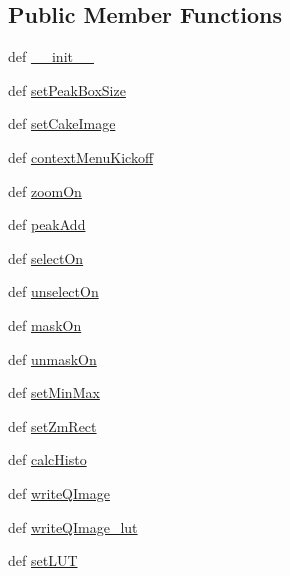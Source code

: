 \subsection*{Public Member Functions}
\begin{DoxyCompactItemize}
\item 
def \hyperlink{classmy_im_display_1_1my_im_display_ac84ff467e290df4e4ab1d4c65d4267f5}{\-\_\-\-\_\-init\-\_\-\-\_\-}
\item 
def \hyperlink{classmy_im_display_1_1my_im_display_ab744180f478698e143f8470430f1d192}{set\-Peak\-Box\-Size}
\item 
def \hyperlink{classmy_im_display_1_1my_im_display_ab09a20ba11a398d503273b7f422c2644}{set\-Cake\-Image}
\item 
def \hyperlink{classmy_im_display_1_1my_im_display_a3352c4bc953e0a9f393d08871e5d1c31}{context\-Menu\-Kickoff}
\item 
def \hyperlink{classmy_im_display_1_1my_im_display_a8093fb201222b74f57c27297f1e6d84a}{zoom\-On}
\item 
def \hyperlink{classmy_im_display_1_1my_im_display_ae60543e0ec298c4a15e385f11091b675}{peak\-Add}
\item 
def \hyperlink{classmy_im_display_1_1my_im_display_a29d16cbb8188fd3f8c15fa6014b231e8}{select\-On}
\item 
def \hyperlink{classmy_im_display_1_1my_im_display_a6f9207ced879b40fb101f1994ba71eef}{unselect\-On}
\item 
def \hyperlink{classmy_im_display_1_1my_im_display_a7411fd0ab99914cd633c779309de1d07}{mask\-On}
\item 
def \hyperlink{classmy_im_display_1_1my_im_display_a30939cb6a115426fc1d37960cbb19297}{unmask\-On}
\item 
def \hyperlink{classmy_im_display_1_1my_im_display_acd33a2cd440fea030b809b07d9356e10}{set\-Min\-Max}
\item 
def \hyperlink{classmy_im_display_1_1my_im_display_a68c47131be6412075f42b0b1725f9964}{set\-Zm\-Rect}
\item 
def \hyperlink{classmy_im_display_1_1my_im_display_a05a3f0227ee151a60323a4c1a98fb48f}{calc\-Histo}
\item 
def \hyperlink{classmy_im_display_1_1my_im_display_a54c41ffb58933e7d11d44267fd893330}{write\-Q\-Image}
\item 
def \hyperlink{classmy_im_display_1_1my_im_display_aaf7a8e0381472923f2b0c40ab8b2b842}{write\-Q\-Image\-\_\-lut}
\item 
def \hyperlink{classmy_im_display_1_1my_im_display_a4547adad958556b811c45e2a4b89308e}{set\-L\-U\-T}

\end{DoxyCompactItemize}
